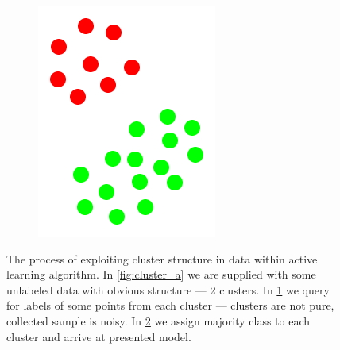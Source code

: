 \documentclass[12pt, a4paper, pdflatex, leqno, twoside]{report}
\begin{document}
\begin{figure}[htbp]
\begin{subfigure}[b]{0.3\textwidth}
    \caption{\label{fig:cluster_b}}
  \end{subfigure}
  \begin{subfigure}[b]{0.3\textwidth}
    \centering
    \includegraphics[width=0.5\linewidth]{graphics/cluster3.png}
    \caption{\label{fig:cluster_c}}
  \end{subfigure}
\begin{tiny}
\caption{The process of exploiting cluster structure in data within active 
learning algorithm. In \ref{fig:cluster_a} we are supplied with some unlabeled 
data with obvious structure --- 2 clusters. In \ref{fig:cluster_b} we query for 
labels of some points from each cluster --- clusters are not pure, collected 
sample is noisy. In \ref{fig:cluster_c} we assign majority class to each 
cluster and arrive at presented model.\label{fig:cluster}}
\end{tiny}
\vspace{1cm}
\end{figure}
\end{document}
